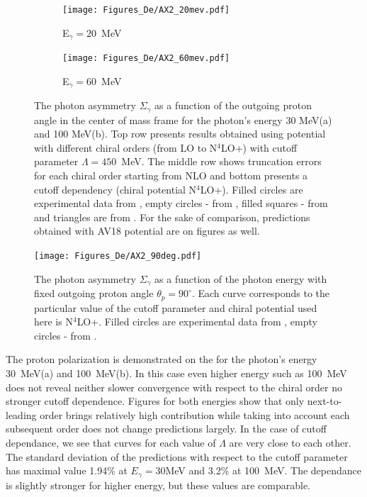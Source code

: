     \begin{figure}[h]
        \centering
        \begin{subfigure}[b]{0.46\textwidth}
            \texttt{[image: Figures\_De/AX2\_20mev.pdf]}
            \caption{\small E$_\gamma = 20$~MeV}
            \label{AX_20_vert}
        \end{subfigure}
        \begin{subfigure}[b]{0.46\textwidth}
            \texttt{[image: Figures\_De/AX2\_60mev.pdf]}
            \caption{\small E$_\gamma = 60$~MeV}
            \label{AX_60_vert}
        \end{subfigure}
        \caption{The photon asymmetry $\Sigma_\gamma$ 
        as a function of the outgoing proton angle in the center of mass frame 
        for the photon's energy 30 MeV(a) and 100 MeV(b).
        Top row presents results obtained using potential
        with different chiral orders (from LO to N$^4$LO+) with cutoff parameter $\Lambda=450$~MeV.
        The middle row shows truncation errors for each 
        chiral order starting from NLO and
        bottom presents a cutoff dependency (chiral potential N$^4$LO+).
        Filled circles are experimental data from \cite{KRAUSE1992_asymetry},
        empty circles - from \cite{depascale_asymmetry}, filled squares
        - from \cite{Barannik_asymetry} and triangles are from \cite{Vnukov_asymmetry}.
        For the sake of comparison, predictions obtained with AV18 potential are on  figures as well.}
        \label{assymetry}
    \end{figure}
     
    \begin{figure}[h]
        \begin{center}
        \texttt{[image: Figures\_De/AX2\_90deg.pdf]}
        \end{center}
        \caption{The photon asymmetry $\Sigma_\gamma$ 
        as a function of the photon energy  
        with fixed outgoing proton angle $\theta_p=90^\circ$.
        Each curve corresponds to the particular value of the cutoff parameter
        and chiral potential used here is N$^4$LO+.
        Filled circles are experimental data from \cite{delbianco_1981},
        empty circles - from \cite{depascale_asymmetry}.}
        \label{asymmetry_90deg}
    \end{figure}
    

    The proton polarization is demonstrated on the  for the 
    photon's energy 30~MeV(a) and 100~MeV(b). In this case even higher energy
    such as 100~MeV does not reveal neither
    slower convergence with respect to the chiral order no
    stronger cutoff dependence. Figures for both energies show
    that only next-to-leading order brings relatively high contribution
    while taking into account each subsequent order does not change predictions
    largely. In the case of cutoff dependance, we see that curves for each
    value of $\Lambda$ are very close to each other. 
    The standard deviation of the predictions with respect to the cutoff parameter
    has maximal value 1.94\% at $E_\gamma = 30$MeV and 3.2\% at 100~MeV.
    The dependance is slightly stronger for higher energy, but these values are comparable.


